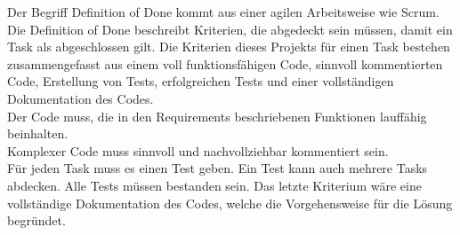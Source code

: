 Der Begriff Definition of Done kommt aus einer agilen Arbeitsweise wie Scrum.\\
Die Definition of Done beschreibt Kriterien, die abgedeckt sein müssen, damit ein Task als abgeschlossen gilt.
Die Kriterien dieses Projekts für einen Task bestehen zusammengefasst aus einem voll funktionsfähigen Code, sinnvoll kommentierten Code, Erstellung von Tests, erfolgreichen Tests und einer vollständigen Dokumentation des Codes.\\
Der Code muss, die in den Requirements beschriebenen Funktionen lauffähig beinhalten.\\
Komplexer Code muss sinnvoll und nachvollziehbar kommentiert sein.\\
Für jeden Task muss es einen Test geben. Ein Test kann auch mehrere Tasks abdecken. Alle Tests müssen bestanden sein.
Das letzte Kriterium wäre eine vollständige Dokumentation des Codes, welche die Vorgehensweise für die Lösung begründet.